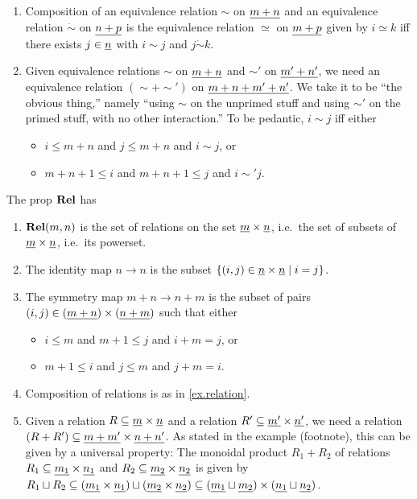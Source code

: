 \documentclass[7Sketches]{subfiles}
\begin{document}
{\begin{description}
\begin{enumerate}
\begin{itemize}
			\item $m+1\leq i\leq m+n+n$ and $m+1\leq j\leq m+n+n$ and $|i-j|=n$.
		\end{itemize}
		\item Composition of an equivalence relation $\sim$ on $\underline{{m+n}}$ and an equivalence relation $\dot\sim$ on $\underline{{n+p}}$ is the equivalence relation $\simeq$ on $\underline{{m+p}}$ given by $i\simeq k$ iff there exists $j\in\underline{{n}}$ with $i\sim j$ and $j\dot\sim k$.
		\item Given equivalence relations $\sim$ on $\underline{{m+n}}$ and $\sim'$ on $\underline{{m'+n'}}$, we need an equivalence relation $(\sim+\sim')$ on $\underline{{m+n+m'+n'}}$. We take it to be ``the obvious thing,'' namely ``using $\sim$ on the unprimed stuff and using $\sim'$ on the primed stuff, with no other interaction.'' To be pedantic, $i\sim j$ iff either
		\begin{itemize}
			\item $i\leq m+n$ and $j\leq m+n$ and $i\sim j$, or
			\item $m+n+1\leq i$ and $m+n+1\leq j$ and $i\sim'j$.
		\end{itemize}
	\end{enumerate}
	\item[\cref{ex.relation}:] The prop $\mathbf{Rel}$ has
	\begin{enumerate}
		\item $\mathbf{Rel}(m,n)$ is the set of relations on the set $\underline{{m}}\times\underline{{n}}$, i.e.\ the set of subsets of $\underline{{m}}\times\underline{{n}}$, i.e.\ its powerset.
		\item The identity map $n\to n$ is the subset $\{(i,j)\in\underline{{n}}\times\underline{{n}}\mid i=j\}$.
		\item The symmetry map $m+n\to n+m$ is the subset of pairs $(i,j)\in(\underline{{m+n}})\times(\underline{{n+m}})$ such that either
		\begin{itemize}
			\item $i\leq m$ and $m+1\leq j$ and $i+m=j$, or
			\item $m+1\leq i$ and $j\leq m$ and $j+m=i$.
		\end{itemize}
		\item Composition of relations is as in \cref{ex.relation}.
		\item Given a relation $R\subseteq\underline{{m}}\times\underline{{n}}$ and a relation $R'\subseteq\underline{{m'}}\times\underline{{n'}}$, we need a relation $(R+R')\subseteq\underline{{m+m'}}\times\underline{{n+n'}}$. As stated in the example (footnote), this can be given by a universal property: The monoidal product $R_1+R_2$ of relations $R_1\subseteq \underline{{m_1}}\times \underline{{n_1}}$ and $R_2\subseteq \underline{{m_2}}\times \underline{{n_2}}$ is given by $R_1\sqcup R_2\subseteq(\underline{{m_1}}\times \underline{{n_1}})\sqcup(\underline{{m_2}}\times \underline{{n_2}})\subseteq(\underline{{m_1}}\sqcup \underline{{m_2}})\times(\underline{{n_1}}\sqcup \underline{{n_2}})$.
	\end{enumerate}
\end{description}
}
\end{document}
